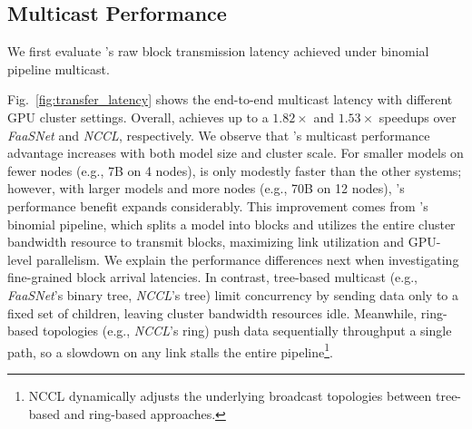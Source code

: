 \subsection{Multicast Performance}
\label{subsec:model_transfer_performance}

We first evaluate \SysName's raw block transmission latency achieved under binomial pipeline multicast. 

Fig.~\ref{fig:transfer_latency} shows the end-to-end multicast latency with different GPU cluster settings. 
Overall, \SysName achieves up to a $1.82\times$ and $1.53\times$ speedups over \textit{FaaSNet} and \textit{NCCL}, respectively. 
We observe that \SysName's multicast performance advantage increases with both model size and cluster scale. For smaller models on fewer nodes (e.g., 7B on 4 nodes), \SysName is only modestly faster than the other systems; however, with larger models and more nodes (e.g., 70B on 12 nodes), \SysName’s performance benefit expands considerably. 
This improvement comes from \SysName's binomial pipeline, %
which splits a model into blocks and utilizes the entire cluster bandwidth resource to transmit blocks, maximizing link utilization and GPU-level parallelism. We explain the performance differences next when investigating fine-grained block arrival latencies. 
In contrast, tree-based multicast (e.g., \textit{FaaSNet}'s binary tree, \textit{NCCL}'s tree) limit concurrency by sending data only to a fixed set of children, leaving cluster bandwidth resources idle. 
Meanwhile, ring-based topologies (e.g., \textit{NCCL}'s ring) push data sequentially throughput a single path, so a slowdown on any link stalls the entire pipeline\footnote{NCCL dynamically adjusts the underlying broadcast topologies between tree-based and ring-based approaches.}. 
\fi 


